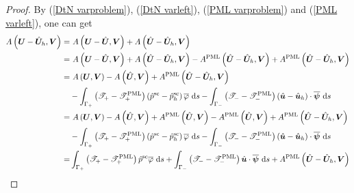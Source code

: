 \documentclass[10pt,a4paper]{amsart}
\begin{document}
\begin{proof}
	By (\ref{DtN varproblem}), (\ref{DtN varleft}), (\ref{PML varproblem}) and (\ref{PML varleft}), one can get
	\begin{align}
		A\left(\boldsymbol{U}-\hat{\boldsymbol{U}}_{h}, \boldsymbol{V}\right)=&~A\left(\boldsymbol{U}-\hat{\boldsymbol{U}}, \boldsymbol{V}\right)
		+ A\left(\hat{\boldsymbol{U}}-\hat{\boldsymbol{U}}_h, \boldsymbol{V}\right) \notag\\
		=&~A\left(\boldsymbol{U}-\hat{\boldsymbol{U}}, \boldsymbol{V}\right)
		+ A\left(\hat{\boldsymbol{U}}-\hat{\boldsymbol{U}}_h, \boldsymbol{V}\right) 
		-A^{\mathrm{PML}}\left(\hat{\boldsymbol{U}}-\hat{\boldsymbol{U}}_h, \boldsymbol{V}\right)
		+A^{\mathrm{PML}}\left(\hat{\boldsymbol{U}}-\hat{\boldsymbol{U}}_h, \boldsymbol{V}\right) \notag\\
		=&~A\left(\boldsymbol{U},\boldsymbol{V}\right)-A\left(\hat{\boldsymbol{U}},\boldsymbol{V}\right)+A^{\mathrm{PML}}\left(\hat{\boldsymbol{U}}-\hat{\boldsymbol{U}}_h, \boldsymbol{V}\right) \notag\\
		&-\int_{\Gamma_+}\left(\mathscr{T}_+-\mathscr{T}_+^{\mathrm{PML}}\right)\left(\hat{p}^{\mathrm{sc}}-\hat{p}^{\mathrm{sc}}_h\right) \overline{\varphi} \mathrm{~d}s -\int_{\Gamma_-}\left(\mathscr{T}_--\mathscr{T}_-^{\mathrm{PML}}\right)\left(\hat{\boldsymbol{u}}-\hat{\boldsymbol{u}}_h\right) \cdot \overline{\boldsymbol{\psi}} \mathrm{~d} s\notag \\
		=&~A\left(\boldsymbol{U},\boldsymbol{V}\right)-A\left(\hat{\boldsymbol{U}},\boldsymbol{V}\right)+A^{\mathrm{PML}}\left(\hat{\boldsymbol{U}},\boldsymbol{V}\right)-A^{\mathrm{PML}}\left(\hat{\boldsymbol{U}}, \boldsymbol{V}\right)
		+A^{\mathrm{PML}}\left(\hat{\boldsymbol{U}}-\hat{\boldsymbol{U}}_h, \boldsymbol{V}\right) \notag\\
		&-\int_{\Gamma_+}\left(\mathscr{T}_+-\mathscr{T}_+^{\mathrm{PML}}\right)\left(\hat{p}^{\mathrm{sc}}-\hat{p}^{\mathrm{sc}}_h\right) \overline{\varphi} \mathrm{~d} s
		-\int_{\Gamma_-}\left(\mathscr{T}_--\mathscr{T}_-^{\mathrm{PML}}\right)\left(\hat{\boldsymbol{u}}-\hat{\boldsymbol{u}}_h\right) \cdot \overline{\boldsymbol{\psi}} \mathrm{~d} s \notag\\
		=&\int_{\Gamma_+}\left(\mathscr{T}_+-\mathscr{T}_+^{\mathrm{PML}}\right)\hat{p}^{\mathrm{sc}} \overline{\varphi} \mathrm{~d} s
		+\int_{\Gamma_-}\left(\mathscr{T}_--\mathscr{T}_-^{\mathrm{PML}}\right)\hat{\boldsymbol{u}} \cdot \overline{\boldsymbol{\psi}} \mathrm{~d} s +A^{\mathrm{PML}}\left(\hat{\boldsymbol{U}}-\hat{\boldsymbol{U}}_h, \boldsymbol{V}\right) \notag\\

\end{align}
\end{proof}
\end{document}
